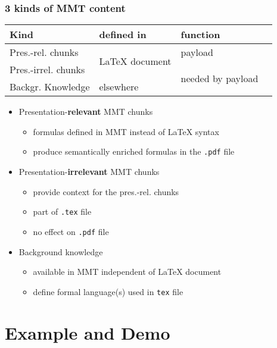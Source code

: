\begin{frame}\frametitle{3 kinds of MMT content}
\begin{center}
\begin{tabular}{|l||l|l|l|}
\hline
Kind & defined in & function \\
\hline
\hline
Pres.-rel. chunks   & \multirow{2}{*}{LaTeX document}  & payload\\
\cline{1-1}\cline{3-3}
Pres.-irrel. chunks &  & \multirow{2}{*}{needed by payload}\\
\cline{1-2}
Backgr. Knowledge         & elsewhere & \\
\hline
\end{tabular}
\end{center}

\begin{itemize}
\item Presentation-\textbf{relevant} MMT chunks
 \begin{itemize}
 \item formulas defined in MMT instead of LaTeX syntax
 \item produce semantically enriched formulas in the \texttt{.pdf} file
 \end{itemize}
\item Presentation-\textbf{irrelevant} MMT chunks
 \begin{itemize}
 \item provide context for the pres.-rel. chunks
 \item part of \texttt{.tex} file
 \item no effect on \texttt{.pdf} file
 \end{itemize}
\item Background knowledge
 \begin{itemize}
 \item available in MMT independent of LaTeX document
 \item define formal language(s) used in \texttt{tex} file
 \end{itemize}
\end{itemize}
\end{frame}

\section{Example and Demo}

